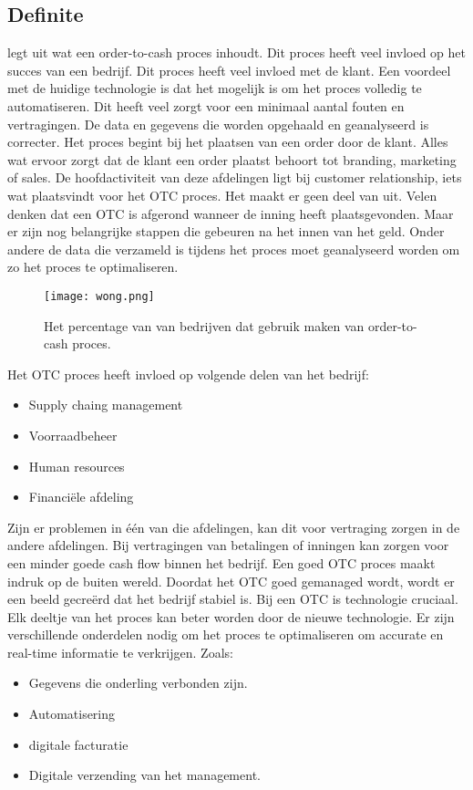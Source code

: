 \subsection{Definite}
\textcite{Wong2018} legt uit wat een order-to-cash proces inhoudt. Dit proces heeft veel invloed op het succes van een bedrijf. Dit proces heeft veel invloed met de klant. Een voordeel met de huidige technologie is dat het mogelijk is om het proces volledig te automatiseren. Dit heeft veel zorgt voor een minimaal aantal fouten en vertragingen. De data en gegevens die worden opgehaald en geanalyseerd is correcter. 
Het proces begint bij het plaatsen van een order door de klant. Alles wat ervoor zorgt dat de klant een order plaatst behoort tot branding, marketing of sales. De hoofdactiviteit van deze afdelingen ligt bij customer relationship, iets wat plaatsvindt voor het OTC proces. Het maakt er geen deel van uit. 
Velen denken dat een OTC is afgerond wanneer de inning heeft plaatsgevonden. Maar er zijn nog belangrijke stappen die gebeuren na het innen van het geld. Onder andere de data die verzameld is tijdens het proces moet geanalyseerd worden om zo het proces te optimaliseren. 
\begin{figure}[h]
	\texttt{[image: wong.png]}
	\caption{Het percentage van van bedrijven dat gebruik maken van order-to-cash proces. \textcite{Wong2018}}
	\centering
\end{figure}
Het OTC proces heeft invloed op volgende delen van het bedrijf:
\begin{itemize}
	\item Supply chaing management
	\item Voorraadbeheer
	\item Human resources
	\item Financiële afdeling
\end{itemize}
Zijn er problemen in één van die afdelingen, kan dit voor vertraging zorgen in de andere afdelingen. Bij vertragingen van betalingen of inningen kan zorgen voor een minder goede cash flow binnen het bedrijf. 
Een goed OTC proces maakt indruk op de buiten wereld. Doordat het OTC goed gemanaged wordt, wordt er een beeld gecreërd dat het bedrijf stabiel is. 
Bij een OTC is technologie cruciaal. Elk deeltje van het proces kan beter worden door de nieuwe  technologie. Er zijn verschillende onderdelen nodig om het proces te optimaliseren om accurate en real-time informatie te verkrijgen. Zoals: 
\begin{itemize}
	\item Gegevens die onderling verbonden zijn.
	\item Automatisering
	\item digitale facturatie
	\item Digitale verzending van het management.
\end{itemize}


